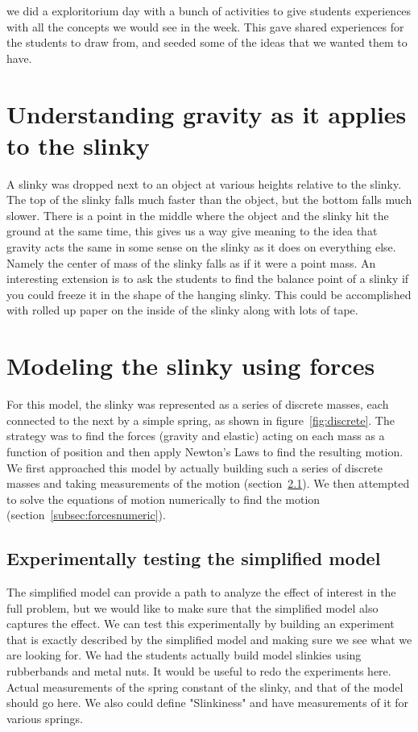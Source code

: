 \documentclass[aps,pre,10pt,superscriptaddress,showpacs,amsmath,amssymb,nofootinbib]{revtex4-1}
\newcommand{\subsec}[1]{section~\ref{subsec:#1}}
\newcommand{\fig}[1]{figure~\ref{fig:#1}}
\begin{document}
we did a exploritorium day with a bunch of activities to give students
experiences with all the concepts we would see in the week.  This gave shared
experiences for the students to draw from, and seeded some of the ideas that we
wanted them to have.

\section{Understanding gravity as it applies to the slinky}
A slinky was dropped next to an object at various heights relative to the
slinky.  The top of the slinky falls much faster than the object, but the bottom
falls much slower.  There is a point in the middle where the object and the
slinky hit the ground at the same time, this gives us a way give meaning to the
idea that gravity acts the same in some sense on the slinky as it does on
everything else. Namely the center of mass of the slinky falls as if it were a
point mass. An interesting extension is to ask the students to find the balance
point of a slinky if you could freeze it in the shape of the hanging slinky. 
This could be accomplished with rolled up paper on the inside of the slinky
along with lots of tape.



\section{Modeling the slinky using forces}
\label{sec:forces}

For this model, the slinky was represented as a series of discrete masses, each
connected to the next by a simple spring, as shown in \fig{discrete}. The strategy
was to find the forces (gravity and elastic) acting on each mass as a function of position and then
apply Newton's Laws to find the resulting motion. We first approached this model
by actually building such a series of discrete masses and taking measurements of
the motion (\subsec{forcesexperiment}). We then attempted to solve the equations
of motion numerically to find the motion (\subsec{forcesnumeric}).

\subsection{Experimentally testing the simplified model}
\label{subsec:forcesexperiment}
The simplified model can provide a path to analyze the effect of interest in the
full problem, but we would like to make sure that the simplified model also
captures the effect.  We can test this experimentally by building an experiment
that is exactly described by the simplified model and making sure we see what we
are looking for.  We had the students actually build model slinkies using
rubberbands and metal nuts.  It would be useful to redo the experiments here.
Actual measurements of the spring constant of the slinky, and that of the model 
should go here.  We also could define "Slinkiness" and have measurements of it
for various springs.
\end{document}
